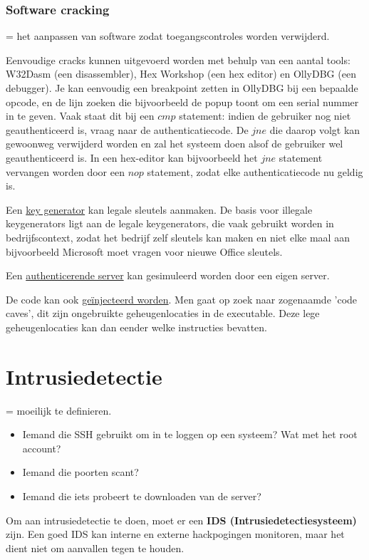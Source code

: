 \documentclass{report}
\begin{document}
	\subsection{Software cracking}
	= het aanpassen van software zodat toegangscontroles worden verwijderd.

	Eenvoudige cracks kunnen uitgevoerd worden met behulp van een aantal tools: W32Dasm (een disassembler), Hex Workshop (een hex editor) en OllyDBG (een debugger). Je kan eenvoudig een breakpoint zetten in OllyDBG bij een bepaalde opcode, en de lijn zoeken die bijvoorbeeld de popup toont om een serial nummer in te geven. Vaak staat dit bij een $cmp$ statement: indien de gebruiker nog niet geauthenticeerd is, vraag naar de authenticatiecode. De $jne$ die daarop volgt kan gewoonweg verwijderd worden en zal het systeem doen alsof de gebruiker wel geauthenticeerd is. In een hex-editor kan bijvoorbeeld het $jne$ statement vervangen worden door een $nop$ statement, zodat elke authenticatiecode nu geldig is.

	Een \underline{key generator} kan legale sleutels aanmaken. De basis voor illegale keygenerators ligt aan de legale keygenerators, die vaak gebruikt worden in bedrijfscontext, zodat het bedrijf zelf sleutels kan maken en niet elke maal aan bijvoorbeeld Microsoft moet vragen voor nieuwe Office sleutels.	

	Een \underline{authenticerende server} kan gesimuleerd worden door een eigen server.

	De code kan ook \underline{geïnjecteerd worden}. Men gaat op zoek naar zogenaamde 'code caves', dit zijn ongebruikte geheugenlocaties in de executable. Deze lege geheugenlocaties kan dan eender welke instructies bevatten.

	\chapter{Intrusiedetectie}
	= moeilijk te definieren.
	\begin{itemize}
		\item Iemand die SSH gebruikt om in te loggen op een systeem? Wat met het root account?
		\item Iemand die poorten scant?
		\item Iemand die iets probeert te downloaden van de server?
	\end{itemize}

	Om aan intrusiedetectie te doen, moet er een \textbf{IDS (Intrusiedetectiesysteem)} zijn. Een goed IDS kan interne en externe hackpogingen monitoren, maar het dient niet om aanvallen tegen te houden.
\end{document}
